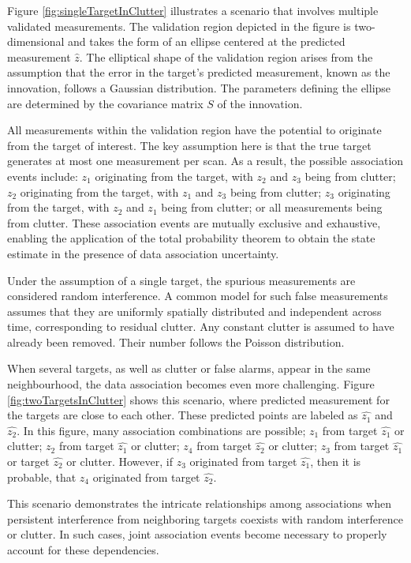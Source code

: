 Figure \ref{fig:singleTargetInClutter} illustrates a scenario that involves multiple validated measurements. The validation region depicted in the
figure is two-dimensional and takes the form of \linebreak an ellipse centered at the predicted measurement $\hat{z}$. The
elliptical shape of the validation region arises from the assumption that the error in the target's predicted
measurement, known as the innovation, follows a Gaussian distribution. The parameters defining the ellipse are
determined by the covariance matrix $S$ of the innovation.

All measurements within the validation region have the potential to originate from the target of interest. The key assumption
here is that the true
target generates
at most one
measurement
per scan. As a
result, the possible association events include: $z_1$ originating
from the target, with $z_2$ and $z_3$ being from clutter; $z_2$ originating from the target, with $z_1$ and $z_3$
being from clutter; $z_3$ originating from the target, with $z_2$ and $z_1$ being from clutter; or all measurements
being from clutter. These association events are mutually exclusive and exhaustive, enabling the application of the
total probability theorem to obtain the state estimate in the presence of data association uncertainty.

Under the assumption of a single target, the spurious measurements are considered random interference. A common model
for such false measurements assumes that they are uniformly spatially distributed and independent across time,
corresponding to residual clutter. Any constant clutter is assumed to have already been removed. Their number follows
the Poisson distribution.


When several targets, as well as clutter or false alarms, appear in the same neighbourhood, the data association becomes
even more challenging. Figure \ref{fig:twoTargetsInClutter} shows this scenario, where predicted measurement for the
targets are close to each other. These predicted points are labeled as $\hat{z_1}$ and $\hat{z_2}$. In this figure,
many association combinations are possible; $z_1$ from target $\hat{z_1}$ or clutter; $z_2$ from target $\hat{z_1}$
or clutter; $z_4$ from target $\hat{z_2}$ or clutter; $z_3$ from target $\hat{z_1}$ or target $\hat{z_2}$ or clutter. However, if $z_3$ originated from target $\hat{z_1}$, then it is probable, that $z_4$ originated from target $\hat{
    z_2}$.

This scenario demonstrates the intricate relationships among associations when persistent interference from neighboring targets coexists with random interference or clutter. In such cases, joint association events become necessary to properly account for these dependencies.

